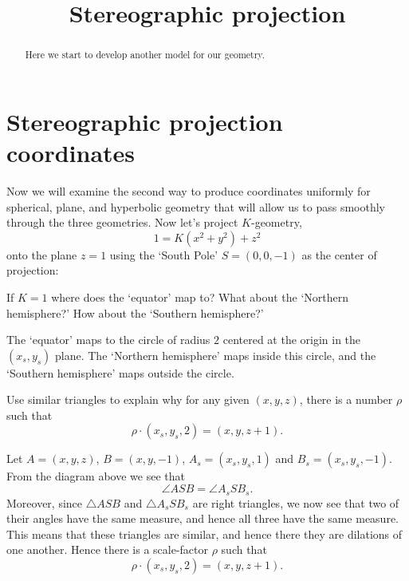 \documentclass{ximera}
\title{Stereographic projection}
\begin{document}
\begin{abstract}
Here we start to develop another model for our geometry.
\end{abstract}
\maketitle


\section{Stereographic projection coordinates}

Now we will examine the second way to produce coordinates uniformly for spherical, plane, and hyperbolic geometry that will allow us to pass smoothly through the three geometries. Now let's project $K$-geometry,
\[
1=K\left(x^{2}+y^{2}\right)+z^{2} 
\]
onto the plane $z=1$ using the `South Pole' $S=(0,0,-1)$ as the center of
projection:

\begin{problem}
  If $K=1$ where does the `equator' map to? What about the `Northern hemisphere?' How about the `Southern hemisphere?'
  \begin{freeResponse}
    The `equator' maps to the circle of radius $2$ centered at the
    origin in the $(x_s,y_s)$ plane.  The `Northern hemisphere' maps
    inside this circle, and the `Southern hemisphere' maps outside the
    circle.
  \end{freeResponse}
\end{problem}

\begin{problem}
  Use similar triangles to explain why for any given $(x,y,z)$, there
  is a number $\rho$ such that
  \[
  \rho\cdot(x_s,y_s,2) = (x,y,z+1).
  \]
  \begin{freeResponse}
    Let $A = (x,y,z)$, $B= (x,y,-1)$, $A_s = (x_s,y_s,1)$ and
    $B_s=(x_s,y_s,-1)$. From the diagram above we see that
    \[
    \angle ASB = \angle A_s S B_s.
    \]
    Moreover, since $\triangle ASB$ and $\triangle A_s S B_s$ are
    right triangles, we now see that two of their angles have the same
    measure, and hence all three have the same measure. This means
    that these triangles are similar, and hence there they are
    dilations of one another. Hence there is a scale-factor $\rho$
    such that
    \[
    \rho\cdot(x_s,y_s,2) = (x,y,z+1).
    \]
  \end{freeResponse}
\end{problem}
\end{document}
